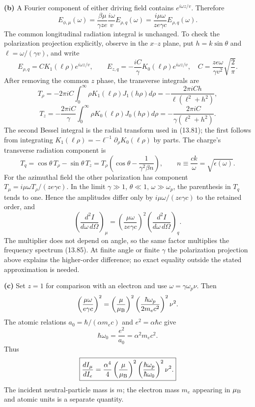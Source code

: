 \textbf{(b)} A Fourier component of either driving field contains
$e^{i\omega z/v}$. Therefore
\[
 E_{\phi,\mu}(\omega)=
 \frac{\beta\mu}{\gamma ze}\frac{i\omega}{v}E_{\rho,q}(\omega)
 =\frac{i\mu\omega}{ze\gamma c}E_{\rho,q}(\omega).
\]
The common longitudinal radiation integral is unchanged. To check the
polarization projection explicitly, observe in the $x$--$z$ plane,
put $h=k\sin\theta$ and $\ell=\omega/(\gamma v)$, and write
\[
 E_{\rho,q}=C K_1(\ell\rho)e^{i\omega z/v},\qquad
 E_{z,q}=-\frac{iC}{\gamma}K_0(\ell\rho)e^{i\omega z/v},
 \quad C=\frac{ze\omega}{\gamma v^2}\sqrt{\frac2\pi}.
\]
After removing the common $z$ phase, the transverse integrals are
\[
 T_\rho=-2\pi iC\int_0^\infty
       \rho K_1(\ell\rho)J_1(h\rho)d\rho
       =-\frac{2\pi iCh}{\ell(\ell^2+h^2)},
\]
\[
 T_z=-\frac{2\pi iC}{\gamma}\int_0^\infty
       \rho K_0(\ell\rho)J_0(h\rho)d\rho
       =-\frac{2\pi iC}{\gamma(\ell^2+h^2)}.
\]
The second Bessel integral is the radial transform used in (13.81);
the first follows from integrating
$K_1(\ell\rho)=-\ell^{-1}\partial_\rho K_0(\ell\rho)$ by parts.
The charge's transverse radiation component is
\[
 T_q=\cos\theta\,T_\rho-\sin\theta\,T_z
 =T_\rho\left(\cos\theta-\frac1{\gamma^2\beta n}\right),\qquad
 n\equiv\frac{ck}{\omega}=\sqrt{\epsilon(\omega)}.
\]
For the azimuthal field the other polarization has component
$T_\mu=i\mu\omega T_\rho/(ze\gamma c)$.
In the limit $\gamma\gg1$, $\theta\ll1$, $\omega\gg\omega_p$,
the parenthesis in $T_q$ tends to one. Hence the amplitudes differ
only by $i\mu\omega/(ze\gamma c)$ to the retained order, and
\[
 \boxed{\left(\frac{d^2I}{d\omega\,d\Omega}\right)_\mu
 =\left(\frac{\mu\omega}{ze\gamma c}\right)^2
  \left(\frac{d^2I}{d\omega\,d\Omega}\right)_q.}
\]
The multiplier does not depend on angle, so the same factor multiplies
the frequency spectrum (13.85). At finite angle or finite $\gamma$
the polarization projection above explains the higher-order difference;
no exact equality outside the stated approximation is needed.

\textbf{(c)} Set $z=1$ for comparison with an electron and use
$\omega=\gamma\omega_p\nu$. Then
\[
 \left(\frac{\mu\omega}{e\gamma c}\right)^2
 =\left(\frac{\mu}{\mu_{\rm B}}\right)^2
   \left(\frac{\hbar\omega_p}{2m_ec^2}\right)^2\nu^2.
\]
The atomic relations $a_0=\hbar/(\alpha m_ec)$ and
$e^2=\alpha\hbar c$ give
\[
 \hbar\omega_0=\frac{e^2}{a_0}=\alpha^2m_ec^2.
\]
Thus
\[
 \boxed{\frac{dI_\mu}{dI_e}
 =\frac{\alpha^4}{4}\left(\frac{\mu}{\mu_{\rm B}}\right)^2
 \left(\frac{\hbar\omega_p}{\hbar\omega_0}\right)^2\nu^2.}
\]
The incident neutral-particle mass is $m$; the electron mass $m_e$
appearing in $\mu_{\rm B}$ and atomic units is a separate quantity.

